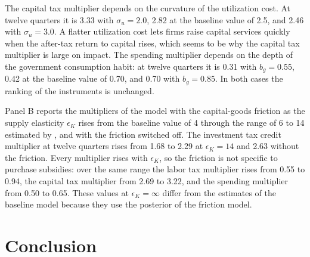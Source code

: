 \documentclass[article,11pt,letterpaper,fleqn]{article}
\theoremstyle{definition}
\numberwithin{equation}{section}
\begin{document}
The capital tax multiplier depends on the curvature of the utilization cost. At twelve quarters it is 3.33 with $\sigma_u = 2.0$, 2.82 at the baseline value of 2.5, and 2.46 with $\sigma_u = 3.0$. A flatter utilization cost lets firms raise capital services quickly when the after-tax return to capital rises, which seems to be why the capital tax multiplier is large on impact. The spending multiplier depends on the depth of the government consumption habit: at twelve quarters it is 0.31 with $b_g = 0.55$, 0.42 at the baseline value of 0.70, and 0.70 with $b_g = 0.85$. In both cases the ranking of the instruments is unchanged.

Panel B reports the multipliers of the model with the capital-goods friction as the supply elasticity $\epsilon_K$ rises from the baseline value of 4 through the range of 6 to 14 estimated by \citet{House_Shapiro_2008}, and with the friction switched off. The investment tax credit multiplier at twelve quarters rises from 1.68 to 2.29 at $\epsilon_K = 14$ and 2.63 without the friction. Every multiplier rises with $\epsilon_K$, so the friction is not specific to purchase subsidies: over the same range the labor tax multiplier rises from 0.55 to 0.94, the capital tax multiplier from 2.69 to 3.22, and the spending multiplier from 0.50 to 0.65. These values at $\epsilon_K = \infty$ differ from the estimates of the baseline model because they use the posterior of the friction model.





\section{Conclusion}
\label{sec:conclusion}
\end{document}
